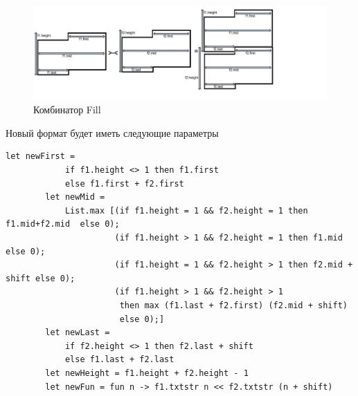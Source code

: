 \documentclass{matmex-diploma}
\begin{document}
\begin{figure}[h]
	\includegraphics[scale=0.5]{Images/image12.png}
	\caption{Комбинатор Fill}
\end{figure}
\newpage

Новый формат будет иметь следующие параметры
\begin{lstlisting}
let newFirst = 
            if f1.height <> 1 then f1.first
            else f1.first + f2.first
        let newMid =
            List.max [(if f1.height = 1 && f2.height = 1 then f1.mid+f2.mid  else 0);
                      (if f1.height > 1 && f2.height = 1 then f1.mid         else 0); 
                      (if f1.height = 1 && f2.height > 1 then f2.mid + shift else 0);
                      (if f1.height > 1 && f2.height > 1 
                       then max (f1.last + f2.first) (f2.mid + shift) 
                       else 0);]
        let newLast = 
            if f2.height <> 1 then f2.last + shift
            else f1.last + f2.last
        let newHeight = f1.height + f2.height - 1
        let newFun = fun n -> f1.txtstr n << f2.txtstr (n + shift)
\end{lstlisting}
\end{document}
